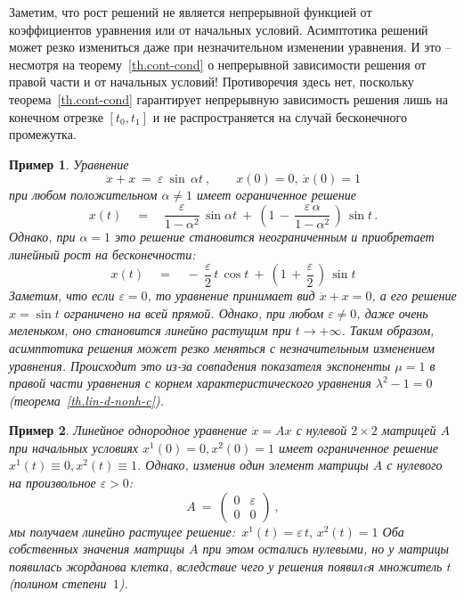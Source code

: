 \documentclass[12pt,a4paper]{article}
\newtheorem{ex}{Пример}
\begin{document}
Заметим, что рост решений не является непрерывной функцией от коэффициентов уравнения или от начальных условий.
Асимптотика решений может резко измениться даже при незначительном изменении уравнения.
И это -- несмотря на теорему~\ref{th.cont-cond} о непрерывной зависимости решения от правой части и от начальных условий!
Противоречия здесь нет,   поскольку теорема~\ref{th.cont-cond} гарантирует непрерывную зависимость решения
лишь на конечном отрезке $[t_0, t_1]$ и не распространяется на случай бесконечного промежутка.
\begin{ex}\label{ex.resonance1}
{\em Уравнение
$$
\ddot x + x \ = \ \varepsilon \ \sin \, \alpha t\ , \qquad
x(0) = 0, \ \dot x(0) = 1
$$
при любом положительном $\alpha \ne  1$ имеет ограниченное решение
$$
x(t) \quad  = \quad  \frac{\varepsilon}{1 - \alpha^2}\, \sin \alpha t\ + \ \left(
1\,  - \, \frac{\varepsilon \, \alpha }{1 - \alpha^2}\, \right)\, \sin t\, .
 $$
 Однако, при $\alpha =  1$ это решение становится неограниченным и приобретает
линейный рост на бесконечности:
$$
 x(t) \quad = \quad  - \ \frac{\varepsilon}{2} \, t \, \cos t \ + \
 \left(
1\,  +
 \, \frac{\varepsilon }{2}\, \right)\, \sin t
$$
Заметим, что если $\varepsilon = 0$, то уравнение принимает вид $\ddot x + x = 0$, а его решение $x = \sin t$
ограничено на всей прямой. Однако, при любом $\varepsilon \ne 0$, даже очень меленьком, оно становится линейно растущим при $t \to +\infty$. Таким образом, асимптотика решения может резко меняться с незначительным изменением
уравнения.
Происходит это из-за совпадения показателя экспоненты $\mu = 1$ в правой части уравнения с
корнем характеристического уравнения $\lambda^2 - 1 = 0$ (теорема~\ref{th.lin-d-nonh-c}).
}
\end{ex}
\begin{ex}\label{ex.resonance2}
{\em Линейное однородное уравнение $\dot x = Ax$ с нулевой $2\times 2$ матрицей $A$ при начальных
условиях $x^1(0) = 0, x^2(0) = 1$ имеет ограниченное решение $x^1(t) \equiv 0, x^2 (t) \equiv 1$.
Однако, изменив один элемент матрицы $A$ с нулевого на произвольное $\varepsilon > 0$:
$$
A \ = \ \left(
\begin{array}{cc}
0 & \varepsilon\\
0 & 0
\end{array}
\right)\ ,
$$
мы получаем линейно растущее решение: $\, x^1(t) =  \varepsilon \, t, \, x^2 (t) = 1$
Оба собственных значения матрицы $A$ при этом остались нулевыми, но у матрицы появилась жорданова клетка,
вследствие чего у решения появилcя множитель $t$ (полином степени~$1$).
}
\end{ex}
\end{document}
